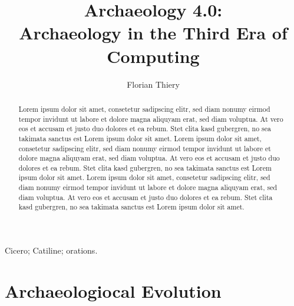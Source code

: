 \documentclass[twocolumn]{autart}
\begin{document}
\begin{frontmatter}

\title{Archaeology 4.0: \protect\\ Archaeology in the Third Era of Computing}
                                               

\author[FT]{Florian Thiery}

\address[FT]{Research Software Engineer, Mainz, Germany}  %

          
\begin{keyword}                           %
Cicero; Catiline; orations.               %
\end{keyword}                             %


\begin{abstract}                         

Lorem ipsum dolor sit amet, consetetur sadipscing elitr, sed diam nonumy eirmod tempor invidunt ut labore et dolore magna aliquyam erat, sed diam voluptua. At vero eos et accusam et justo duo dolores et ea rebum. Stet clita kasd gubergren, no sea takimata sanctus est Lorem ipsum dolor sit amet. Lorem ipsum dolor sit amet, consetetur sadipscing elitr, sed diam nonumy eirmod tempor invidunt ut labore et dolore magna aliquyam erat, sed diam voluptua. At vero eos et accusam et justo duo dolores et ea rebum. Stet clita kasd gubergren, no sea takimata sanctus est Lorem ipsum dolor sit amet. Lorem ipsum dolor sit amet, consetetur sadipscing elitr, sed diam nonumy eirmod tempor invidunt ut labore et dolore magna aliquyam erat, sed diam voluptua. At vero eos et accusam et justo duo dolores et ea rebum. Stet clita kasd gubergren, no sea takimata sanctus est Lorem ipsum dolor sit amet. 

\end{abstract}

\end{frontmatter}

\section{Archaeologiocal Evolution}
\end{document}
